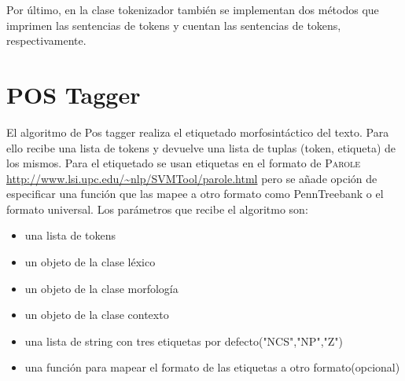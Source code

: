 Por último, en la clase tokenizador también se implementan dos métodos que imprimen las sentencias de tokens y cuentan las sentencias de tokens, respectivamente. 

\section{POS Tagger}
El algoritmo de Pos tagger realiza el etiquetado morfosintáctico del texto. Para ello recibe una lista de tokens y devuelve una lista de tuplas (token, etiqueta) de los mismos. Para el etiquetado se usan etiquetas en el formato de \textsc{Parole} \url{http://www.lsi.upc.edu/~nlp/SVMTool/parole.html}  pero se añade opción de especificar una función que las mapee a otro formato como PennTreebank o el formato universal. \newline
Los parámetros que recibe el algoritmo son: 
\begin{itemize}
\item una lista de tokens
\item un objeto de la clase léxico
\item un objeto de la clase morfología
\item un objeto de la clase contexto
\item una lista de string con tres etiquetas por defecto("NCS","NP","Z")
\item una función para mapear el formato de las etiquetas a otro formato(opcional)
\end{itemize}

